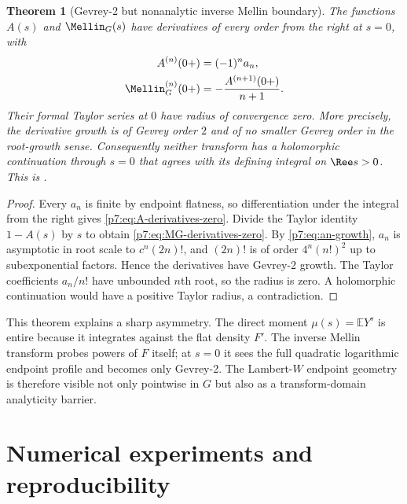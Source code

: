 \documentclass[11pt,oneside]{article}
\newtheorem{theorem}{Theorem}[section]
\theoremstyle{definition}
\theoremstyle{remark}
\newcommand{\E}{\mathbb E}
\newcommand{\1}{\mathbf 1}
\begin{document}
\begin{theorem}[Gevrey-2 but nonanalytic inverse Mellin boundary]
\label{p7:thm:Gevrey-barrier}
The functions $A(s)$ and $\Mellin_G(s)$ have derivatives of every order from the right at
$s=0$, with
\begin{align}
 A^{(n)}(0+)&=(-1)^na_n,\label{p7:eq:A-derivatives-zero}\\
 \Mellin_G^{(n)}(0+)&=-\frac{A^{(n+1)}(0+)}{n+1}.
 \label{p7:eq:MG-derivatives-zero}
\end{align}
Their formal Taylor series at $0$ have radius of convergence zero.  More precisely, the
derivative growth is of Gevrey order $2$ and of no smaller Gevrey order in the root-growth
sense.  Consequently neither transform has a holomorphic continuation through $s=0$ that
agrees with its defining integral on $\Ree s>0$.  This is \statusderived.
\end{theorem}

\begin{proof}
Every $a_n$ is finite by endpoint flatness, so differentiation under the integral from the
right gives \cref{p7:eq:A-derivatives-zero}.  Divide the Taylor identity
$1-A(s)$ by $s$ to obtain \cref{p7:eq:MG-derivatives-zero}.  By
\cref{p7:eq:an-growth}, $a_n$ is asymptotic in root scale to
$c^n(2n)!$, and $(2n)!$ is of order $4^n(n!)^2$ up to subexponential factors.  Hence the
derivatives have Gevrey-2 growth.  The Taylor coefficients $a_n/n!$ have unbounded $n$th
root, so the radius is zero.  A holomorphic continuation would have a positive Taylor radius,
a contradiction.
\end{proof}

\begin{remark}
This theorem explains a sharp asymmetry.  The direct moment $\mu(s)=\E Y^s$ is entire because
it integrates against the flat density $F'$.  The inverse Mellin transform probes powers of
$F$ itself; at $s=0$ it sees the full quadratic logarithmic endpoint profile and becomes only
Gevrey-2.  The Lambert-$W$ endpoint geometry is therefore visible not only pointwise in $G$
but also as a transform-domain analyticity barrier.
\end{remark}

\section{Numerical experiments and reproducibility}
\label{p7:sec:numerics}
\end{document}
